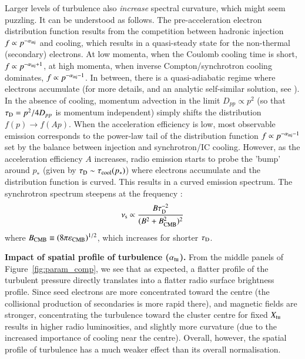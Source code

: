 \documentclass[fleqn,usenatbib,useAMS]{mnras}
\newcommand{\eps}{\varepsilon}
\begin{document}
Larger levels of turbulence also {\it increase} spectral curvature, which might seem puzzling. It can be understood as follows. The pre-acceleration electron distribution function results from the competition between hadronic injection $f \propto p^{-\alpha_{\rm inj}}$ and cooling, which results in a quasi-steady state for the non-thermal (secondary) electrons. At low momenta, when the Coulomb cooling time is short, $f \propto p^{-\alpha_{\rm inj}+1}$, at high momenta, when inverse Compton/synchrotron cooling dominates, $f \propto p^{-\alpha_{\rm inj} -1}$. In between, there is a quasi-adiabatic regime where electrons accumulate (for more details, and an analytic self-similar solution, see \citealt{1999ApJ...520..529S, pinzke13}). In the absence of cooling, momentum advection in the limit $D_{pp} \propto p^{2}$ (so that $\tau_{\mathrm{D}} =p^{2}/4 D_{pp}$ is momentum independent) simply shifts the distribution $f(p) \rightarrow f(A p)$. 
When the acceleration efficiency is low, most observable emission corresponds to the power-law tail of the distribution function $f \propto p^{-\alpha_{\rm inj}-1}$ set by the balance between injection and synchrotron/IC cooling. However, as the acceleration efficiency $A$ increases, radio emission starts to probe the 'bump' around $p_{*}$ (given by $\tau_{\rm D} \sim \tau_{\rm cool}(p_{*})$) where electrons accumulate and the distribution function is curved. This results in a curved emission spectrum. The synchrotron spectrum steepens at the frequency \citep{2001MNRAS.320..365B}: 
\begin{equation}
\nu_{\rm s} \propto \frac{B \tau_{\rm D}^{-2}}{(B^{2}+B^{2}_{\rm CMB})^{2}}
\end{equation}
where $B_{\rm CMB} \equiv (8 \upi \eps_{\rm CMB})^{1/2}$, which increases for shorter $\tau_{\rm D}$.  

{\bf Impact of spatial profile of turbulence ($\alpha_{\rm tu}$).} From the middle panels of Figure~\ref{fig:param_comp}, we see that as expected, a flatter profile of the turbulent pressure directly translates into a flatter radio surface brightness profile. Since seed electrons are more concentrated toward the centre (the collisional production of secondaries is more rapid there), and magnetic fields are stronger, concentrating the turbulence toward the cluster centre for fixed $X_{\rm tu}$ results in higher radio luminosities, and slightly more curvature (due to the increased importance of cooling near the centre). Overall, however, the spatial profile of turbulence has a much weaker effect than its overall normalisation. 
\end{document}

